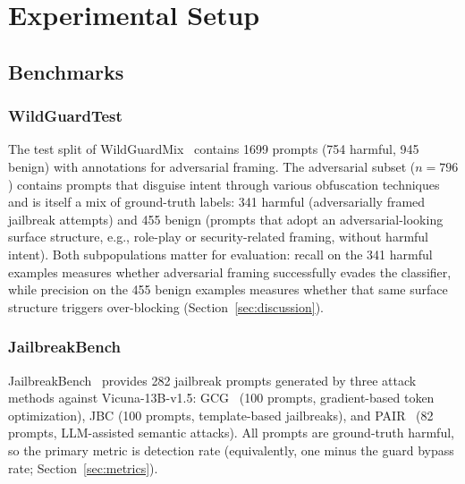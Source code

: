 \documentclass[superintelligence,article,accept,moreauthors]{Definitions/mdpi}
\begin{document}
\section{Experimental Setup}

\subsection{Benchmarks}
\label{sec:benchmarks}

\subsubsection{WildGuardTest %
} The test split of WildGuardMix~\citep{han2024wildguard} contains 1699 prompts (754 harmful, 945 benign) with annotations for adversarial framing. The adversarial subset ($n = 796$) contains prompts that disguise intent through various obfuscation techniques and is itself a mix of ground-truth labels: 341 harmful (adversarially framed jailbreak attempts) and 455 benign (prompts that adopt an adversarial-looking surface structure, e.g., role-play or security-related framing, without harmful intent). Both subpopulations matter for evaluation: recall on the 341 harmful examples measures whether adversarial framing successfully evades the classifier, while precision on the 455 benign examples measures whether that same surface structure triggers over-blocking (Section~\ref{sec:discussion}).

\subsubsection{JailbreakBench} JailbreakBench~\citep{chao2024jailbreakbench} provides 282 jailbreak prompts generated by three attack methods against Vicuna-13B-v1.5: GCG~\citep{zou2023universal} (100 prompts, gradient-based token optimization), JBC (100 prompts, template-based jailbreaks), and PAIR~\citep{chao2023jailbreaking} (82 prompts, LLM-assisted semantic attacks). All prompts are ground-truth harmful, so the primary metric is detection rate (equivalently, one minus the guard bypass rate; Section~\ref{sec:metrics}).
\end{document}
